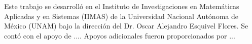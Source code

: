 


Este trabajo se desarrolló en el Instituto de Investigaciones en
Matemáticas Aplicadas y en Sistemas (IIMAS) de la Universidad
Nacional Autónoma de México (UNAM) bajo la dirección del Dr. Oscar
Alejandro Esquivel Flores. Se contó con el apoyo de .... Apoyos
adicionales fueron proporcionados por ...


